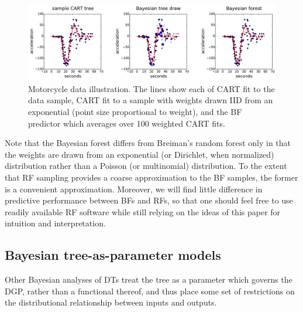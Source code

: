 \documentclass{article}
\begin{document}
\begin{figure}
\includegraphics[width=\textwidth]{../graphs/mcycle}   
\caption{\label{mcycle} Motorcycle data illustration.  The lines show each of CART fit to the data sample, CART fit to a sample with weights drawn IID from an exponential (point size proportional to weight), and the BF predictor which averages over 100 weighted CART fits.} 
\end{figure}    

Note that the Bayesian forest differs from Breiman's random
forest only in that the weights are drawn from an exponential (or Dirichlet, when normalized) distribution
rather than a Poisson (or multinomial) distribution. To the extent that RF sampling
provides a coarse approximation to the BF samples, the former is a
convenient approximation.  Moreover, we will find little difference in predictive performance between BFs and RFs, so that one should feel free to use readily available RF software while still relying on the ideas of this paper for intuition and interpretation.


    \subsection{Bayesian tree-as-parameter
models}\label{bayesian-tree-as-parameter-models}



Other Bayesian analyses of DTs treat the tree as
a parameter which governs the DGP, rather than a functional thereof, and thus
place some set of restrictions on the distributional relationship between
inputs and outputs.   
\end{document}
